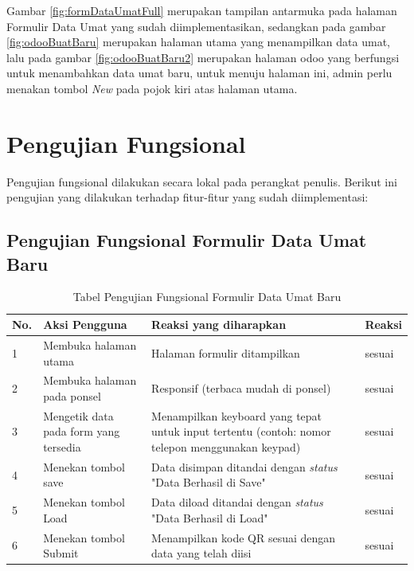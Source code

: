 Gambar \ref{fig:formDataUmatFull} merupakan tampilan antarmuka pada halaman Formulir Data Umat yang sudah diimplementasikan, sedangkan pada gambar \ref{fig:odooBuatBaru} merupakan halaman utama yang menampilkan data umat, lalu pada gambar \ref{fig:odooBuatBaru2} merupakan halaman odoo yang berfungsi untuk menambahkan data umat baru, untuk menuju halaman ini, admin perlu menakan tombol \textit{New} pada pojok kiri atas halaman utama.

\section{Pengujian Fungsional}
\label{sec:pengujianFungsional}

Pengujian fungsional dilakukan secara lokal pada perangkat penulis. Berikut ini pengujian yang dilakukan terhadap fitur-fitur yang sudah diimplementasi:

\subsection{Pengujian Fungsional Formulir Data Umat Baru}

\begin{table}[H]
	\centering
	\caption{Tabel Pengujian Fungsional Formulir Data Umat Baru}
	\begin{tabular}{|p{0.5cm}| p{5cm}| p{5.5cm}| p{2.5cm}|} \hline
		No.	&	Aksi Pengguna	&	Reaksi yang diharapkan	&	Reaksi \\ \hline
		1 	&  Membuka halaman utama & Halaman formulir ditampilkan &	sesuai	\\ \hline
		2 	&  Membuka halaman pada ponsel & Responsif (terbaca mudah di ponsel) &	sesuai	\\ \hline
		3 	&  Mengetik data pada form yang tersedia & Menampilkan keyboard yang tepat untuk input tertentu (contoh: nomor telepon menggunakan keypad) &	sesuai	\\ \hline
		4 	&  Menekan tombol save & Data disimpan ditandai dengan \textit{status} "Data Berhasil di Save" &	sesuai	\\ \hline
		5 	&  Menekan tombol Load & Data diload ditandai dengan \textit{status} "Data Berhasil di Load" &	sesuai	\\ \hline
		6 	&  Menekan tombol Submit & Menampilkan kode QR sesuai dengan data yang telah diisi &	sesuai	\\ \hline
	\end{tabular}
	\label{table:fungsionalFormulir}
\end{table}

